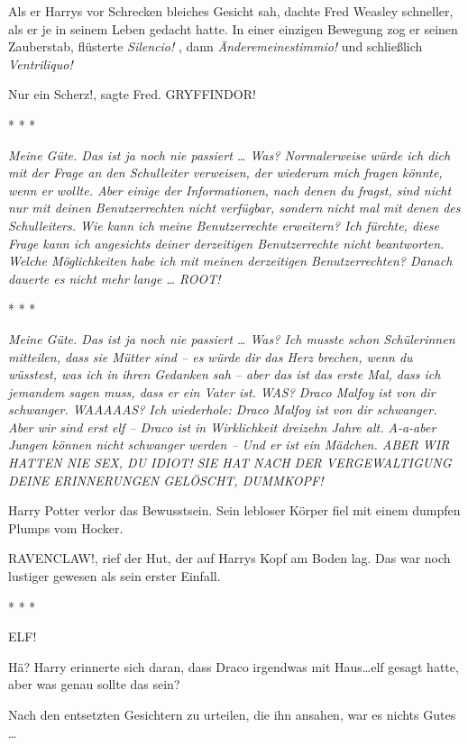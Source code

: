 Als er Harrys vor Schrecken bleiches Gesicht sah, dachte Fred Weasley schneller,
als er je in seinem Leben gedacht hatte. In einer einzigen Bewegung zog er
seinen Zauberstab, flüsterte \emph{\glqq Silencio!\grqq{} }, dann \emph{\glqq
Änderemeinestimmio!\grqq{} } und schließlich \emph{\glqq Ventriliquo!\grqq{} }

\glqq Nur ein Scherz!\grqq{}, sagte Fred. \glqq GRYFFINDOR!\grqq{}

* * *

\emph{\glqq Meine Güte. Das ist ja noch nie passiert …\grqq{}
Was? \glqq Normalerweise würde ich dich mit der Frage an den Schulleiter
verweisen, der wiederum mich fragen könnte, wenn er wollte. Aber einige der
Informationen, nach denen du fragst, sind nicht nur mit deinen Benutzerrechten
nicht verfügbar, sondern nicht mal mit denen des Schulleiters.\grqq{} Wie kann
ich meine Benutzerrechte erweitern? \glqq Ich fürchte, diese Frage kann ich
angesichts deiner derzeitigen Benutzerrechte nicht beantworten.\grqq{} Welche
Möglichkeiten habe\emph{ ich mit meinen derzeitigen Benutzerrechten?} Danach
dauerte es nicht mehr lange … \glqq ROOT!\grqq{}}

* * *

\emph{\glqq Meine Güte. Das ist ja noch nie passiert …\grqq{}
Was? \glqq Ich musste schon Schülerinnen mitteilen, dass sie Mütter sind – es
würde dir das Herz brechen, wenn du wüsstest, was ich in ihren Gedanken sah –
aber das ist das erste Mal, dass ich jemandem sagen muss, dass er ein Vater
ist.\grqq{} WAS? \glqq Draco Malfoy ist von dir schwanger.\grqq{} WAAAAAS? \glqq
Ich wiederhole: Draco Malfoy ist von dir schwanger.\grqq{} Aber wir sind erst
elf – \glqq Draco ist in Wirklichkeit dreizehn Jahre alt.\grqq{} A-a-aber Jungen
können nicht schwanger werden – \glqq Und er ist ein Mädchen.\grqq{} ABER WIR
HATTEN NIE SEX, DU IDIOT! \glqq SIE HAT NACH DER VERGEWALTIGUNG DEINE
ERINNERUNGEN GELÖSCHT, DUMMKOPF!\grqq{} }

Harry Potter verlor das Bewusstsein. Sein lebloser Körper fiel mit einem dumpfen
Plumps vom Hocker.

\glqq RAVENCLAW!\grqq{}, rief der Hut, der auf Harrys Kopf am Boden lag. Das war
noch lustiger gewesen als sein erster Einfall.

* * *

\glqq ELF!\grqq{}

Hä? Harry erinnerte sich daran, dass Draco irgendwas mit \glqq Haus…elf\grqq{}
gesagt hatte, aber was genau sollte das sein?

Nach den entsetzten Gesichtern zu urteilen, die ihn ansahen, war es nichts Gutes
…

